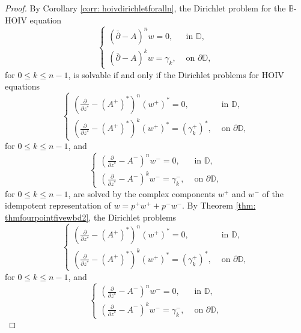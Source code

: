 \documentclass[12pt,reqno]{amsart}
\theoremstyle{definition}
\theoremstyle{remark}
\newcommand{\p}{\partial}
\newcommand{\dbar}{\bar\partial}
\newcommand{\bc}{\mathbb{B}}
\newcommand{\disk}{\mathbb{D}}
\begin{document}
                \begin{proof}

                    By Corollary \ref{corr: hoivdirichletforalln}, the Dirichlet problem for the $\bc$-HOIV equation
                \[
                    \begin{cases}
                        (\dbar-A)^n w = 0, & \text{ in } \disk,\\
                        (\dbar - A)^k w = \gamma_k, & \text{ on } \p\disk,
                    \end{cases}
                \]
                for $0 \leq k \leq n-1$, is solvable if and only if the Dirichlet problems for HOIV equations
                \[
                    \begin{cases}
                        \left( \frac{\p}{\p z^*} - (A^+)^*\right)^n (w^+)^* = 0, & \text{ in } \disk,\\
                        \left( \frac{\p}{\p z^*} - (A^+)^*\right)^k (w^+)^* = (\gamma_k^+)^*, & \text{ on } \p\disk,
                    \end{cases}
                \]
                for $0 \leq k \leq n-1$, and
                \[
                    \begin{cases}
                        \left( \frac{\p}{\p z^*} - A^-\right)^n w^- = 0, & \text{ in } \disk,\\
                        \left( \frac{\p}{\p z^*} - A^-\right)^k w^- = \gamma_k^-, & \text{ on } \p\disk,
                    \end{cases}
                \]
                for $0 \leq k \leq n-1$, are solved by the complex components $w^+$ and $w^-$ of the idempotent representation of $w = p^+ w^+ + p^- w^-$. By Theorem \ref{thm: thmfourpointfivewbd2}, the Dirichlet problems
                \[
                    \begin{cases}
                        \left( \frac{\p}{\p z^*} - (A^+)^*\right)^n (w^+)^* = 0, & \text{ in } \disk,\\
                        \left( \frac{\p}{\p z^*} - (A^+)^*\right)^k (w^+)^* = (\gamma_k^+)^*, & \text{ on } \p\disk,
                    \end{cases}
                \]
                for $0 \leq k \leq n-1$, and
                \[
                    \begin{cases}
                        \left( \frac{\p}{\p z^*} - A^-\right)^n w^- = 0, & \text{ in } \disk,\\
                        \left( \frac{\p}{\p z^*} - A^-\right)^k w^- = \gamma_k^-, & \text{ on } \p\disk,

\end{cases}\]
\end{proof}
\end{document}

